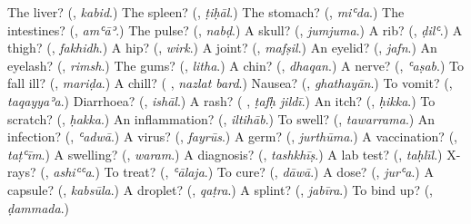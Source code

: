 \begin{tcolorbox}[breakable,colback=teal!4,colframe=teal!35!black,title={Before you move on}]
The liver? (\textbf{}, \emph{kabid}.) The spleen? (\textbf{}, \emph{ṭiḥāl}.) The stomach? (\textbf{}, \emph{miʿda}.) The intestines? (\textbf{}, \emph{amʿāʾ}.) The pulse? (\textbf{}, \emph{nabḍ}.) A skull? (\textbf{}, \emph{jumjuma}.) A rib? (\textbf{}, \emph{ḍilʿ}.) A thigh? (\textbf{}, \emph{fakhidh}.) A hip? (\textbf{}, \emph{wirk}.) A joint? (\textbf{}, \emph{mafṣil}.) An eyelid? (\textbf{}, \emph{jafn}.) An eyelash? (\textbf{}, \emph{rimsh}.) The gums? (\textbf{}, \emph{litha}.) A chin? (\textbf{}, \emph{dhaqan}.) A nerve? (\textbf{}, \emph{ʿaṣab}.) To fall ill? (\textbf{}, \emph{mariḍa}.) A chill? (\textbf{ }, \emph{nazlat bard}.) Nausea? (\textbf{}, \emph{ghathayān}.) To vomit? (\textbf{}, \emph{taqayyaʾa}.) Diarrhoea? (\textbf{}, \emph{ishāl}.) A rash? (\textbf{ }, \emph{ṭafḥ jildī}.) An itch? (\textbf{}, \emph{ḥikka}.) To scratch? (\textbf{}, \emph{ḥakka}.) An inflammation? (\textbf{}, \emph{iltihāb}.) To swell? (\textbf{}, \emph{tawarrama}.) An infection? (\textbf{}, \emph{ʿadwā}.) A virus? (\textbf{}, \emph{fayrūs}.) A germ? (\textbf{}, \emph{jurthūma}.) A vaccination? (\textbf{}, \emph{taṭʿīm}.) A swelling? (\textbf{}, \emph{waram}.) A diagnosis? (\textbf{}, \emph{tashkhīṣ}.) A lab test? (\textbf{}, \emph{taḥlīl}.) X-rays? (\textbf{}, \emph{ashiʿʿa}.) To treat? (\textbf{}, \emph{ʿālaja}.) To cure? (\textbf{}, \emph{dāwā}.) A dose? (\textbf{}, \emph{jurʿa}.) A capsule? (\textbf{}, \emph{kabsūla}.) A droplet? (\textbf{}, \emph{qaṭra}.) A splint? (\textbf{}, \emph{jabīra}.) To bind up? (\textbf{}, \emph{ḍammada}.)
\end{tcolorbox}
